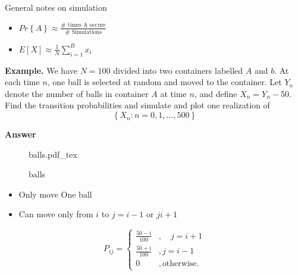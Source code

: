 \documentclass{article}
\newcommand{\incfig}[2][1]{%
\def\svgwidth{#1\columnwidth}
{#2.pdf_tex} } \pdfsuppresswarningpagegroup=1
\theoremstyle{remark}
\begin{document}
 \begin{tcolorbox}
   General notes on simulation 
   \begin{itemize}
     \item

   $Pr \left \{ A  \right \} \approx \frac{\text{# times A occure}}{ \text{# Simulations}}  $
 \item $E\left[ X \right] \approx \frac{1}{N}  \sum_{i=1}^{B}  x_{i}$
   \end{itemize}
 \end{tcolorbox}

   \textbf{Example.} We have $N=100$ divided into two containers labelled $A$ and $ b$. At each time $n$, one ball is selected at random and moved to the container. Let $Y_{n}$ denote the number of balls in container $A$ at time $n$, and define $X_{n} = Y_{n} -50$. Find the transition probabilities and simulate and plot one realization of \[
   \left\{ X_{n}: n  = 0,1, \ldots, 500 \right\}
   \] 

   \textbf{Answer} 
 
\begin{figure}[ht]
    \centering
    \incfig{balls}
    \caption{balls}
    \label{fig:balls}
\end{figure}

\begin{itemize}
  \item Only move One ball
  \item Can move only from $i$ to $ j = i-1$ or  $j i +1$
\end{itemize}
\[
P_{ij} = \begin{cases}
  \frac{50 -i}{ 100 }   & , \quad  j = i+1 \\
   \frac{50+i}{100}   & , j = i-1 \\
   0  & , \text{otherwise}.
\end{cases}
\] 

\end{document}
